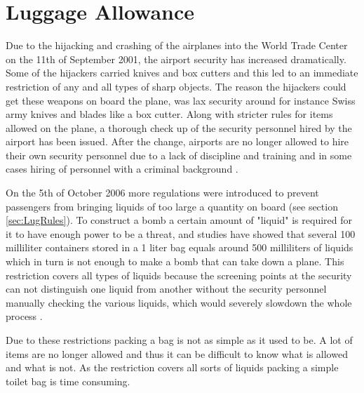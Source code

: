 \section{Luggage Allowance}

Due to the hijacking and crashing of the airplanes into the World Trade Center on the 11th of September 2001, the airport security has increased dramatically. Some of the hijackers carried knives and box cutters and this led to an immediate restriction of any and all types of sharp objects. The reason the hijackers could get these weapons on board the plane, was lax security around for instance Swiss army knives and blades like a box cutter. Along with stricter rules for items allowed on the plane, a thorough check up of the security personnel hired by the airport has been issued. After the change, airports are no longer allowed to hire their own security personnel due to a lack of discipline and training and in some cases hiring of personnel with a criminal background \citep{Stricter_rules}.


On the 5th of October 2006 more regulations were introduced to prevent passengers from bringing liquids of too large a quantity on board (see section \ref{sec:LugRules}). To construct a bomb a certain amount of "liquid" is required for it to have enough power to be a threat, and studies have showed that several 100 milliliter containers stored in a 1 liter bag equals around 500 milliliters of liquids which in turn is not enough to make a bomb that can take down a plane. This restriction covers all types of liquids because the screening points at the security can not distinguish one liquid from another without the security personnel manually checking the various liquids, which would severely slowdown the whole process \citep{Why_rules}.


Due to these restrictions packing a bag is not as simple as it used to be. A lot of items are no longer allowed and thus it can be difficult to know what is allowed and what is not. As the restriction covers all sorts of liquids packing a simple toilet bag is time consuming.
